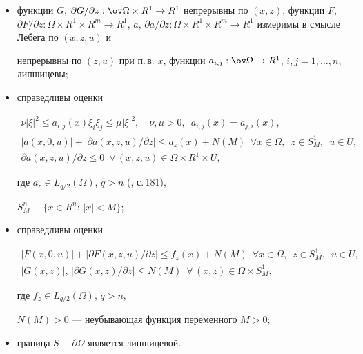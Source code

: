 \begin{itemize}


\item[а)] функции $G$, $\partial G/\partial z:\ov\Omega\times R^1\to


R^1$ непрерывны по $(x,z)$, функции $F$, $\partial F/\partial z:


\Omega\times


R^1\times R^m\to R^1$, $a$, $\partial a/\partial z:\Omega\times


R^1\times R^m\to R^1$ измеримы в смысле Лебега по $(x,z,u)$ и


непрерывны по $(z,u)$ при п.\,в. $x$, функции $a_{i,j}:\ov\Omega\to


R^1$, $i,j=1,\dotsc,n$, липшицевы;


\item[б)] справедливы оценки


\begin{gather*}


\nu|\xi|^2\leq a_{i,j}(x)\xi_i\xi_j\leq\mu|\xi|^2,


\quad\nu,\mu>0,\ \; a_{i,j}(x)=a_{j,i}(x),\\


%


|a(x,0,u)|+|\partial a(x,z,u)/\partial z|\leq a_z(x)+N(M)


\ \; \forall x\in\Omega,\ \; z\in S_M^1,\ \; u\in U,\\


%


\partial a(x,z,u)/\partial z\leq 0\ \; \forall\,(x,z,u)\in\Omega\times R^1


\times U,


\end{gather*}


где $a_z\in L_{q/2}(\Omega)$, $q>n$ (\cite{ladur}, с.\,181),


$S_M^n\equiv\{x\in R^n:\,|x|<M\}$;


\item[в)] справедливы оценки


\begin{gather*}


|F(x,0,u)|+|\partial F(x,z,u)/\partial z|\leq f_z(x)+N(M)


\ \; \forall x\in\Omega,\ \; z\in S_M^1,\ \;u\in U, \\


%


|G(x,z)|,\,|\partial G(x,z)/\partial z|\leq N(M)\ \;


\forall\,(x,z)\in\Omega\times S_M^1,


\end{gather*}


где $f_z\in L_{q/2}(\Omega)$, $q>n$,


$N(M)>0$ --- неубывающая функция переменного $M>0$;


\item[г)] граница $S\equiv\partial\Omega$ является липшицевой.


\end{itemize}





